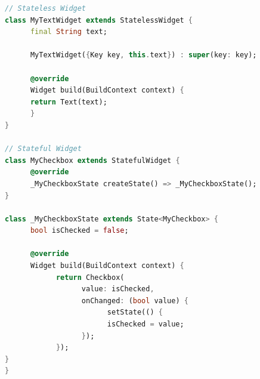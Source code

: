 \begin{lstlisting}[language=Dart, caption=Example of a stateful and stateless widget, label=lst:dartWidgets]
// Stateless Widget
class MyTextWidget extends StatelessWidget {
      final String text;

      MyTextWidget({Key key, this.text}) : super(key: key);

      @override
      Widget build(BuildContext context) {
      return Text(text);
      }
}

// Stateful Widget
class MyCheckbox extends StatefulWidget {
      @override
      _MyCheckboxState createState() => _MyCheckboxState();
}

class _MyCheckboxState extends State<MyCheckbox> {
      bool isChecked = false;

      @override
      Widget build(BuildContext context) {
            return Checkbox(
                  value: isChecked,
                  onChanged: (bool value) {
                        setState(() {
                        isChecked = value;
                  });
            });
}
}
\end{lstlisting}

